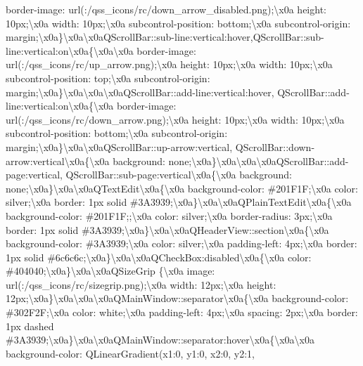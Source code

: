 border-\/image\+: url(\+:/qss\+\_\+icons/rc/down\+\_\+arrow\+\_\+disabled.\+png);\textbackslash{}x0a height\+: 10px;\textbackslash{}x0a width\+: 10px;\textbackslash{}x0a subcontrol-\/position\+: bottom;\textbackslash{}x0a subcontrol-\/origin\+: margin;\textbackslash{}x0a\}\textbackslash{}x0a\textbackslash{}x0a\+Q\+Scroll\+Bar\+::sub-\/line\+:vertical\+:hover,\+Q\+Scroll\+Bar\+::sub-\/line\+:vertical\+:on\textbackslash{}x0a\{\textbackslash{}x0a\textbackslash{}x0a border-\/image\+: url(\+:/qss\+\_\+icons/rc/up\+\_\+arrow.\+png);\textbackslash{}x0a height\+: 10px;\textbackslash{}x0a width\+: 10px;\textbackslash{}x0a subcontrol-\/position\+: top;\textbackslash{}x0a subcontrol-\/origin\+: margin;\textbackslash{}x0a\}\textbackslash{}x0a\textbackslash{}x0a\textbackslash{}x0a\+Q\+Scroll\+Bar\+::add-\/line\+:vertical\+:hover, Q\+Scroll\+Bar\+::add-\/line\+:vertical\+:on\textbackslash{}x0a\{\textbackslash{}x0a border-\/image\+: url(\+:/qss\+\_\+icons/rc/down\+\_\+arrow.\+png);\textbackslash{}x0a height\+: 10px;\textbackslash{}x0a width\+: 10px;\textbackslash{}x0a subcontrol-\/position\+: bottom;\textbackslash{}x0a subcontrol-\/origin\+: margin;\textbackslash{}x0a\}\textbackslash{}x0a\textbackslash{}x0a\+Q\+Scroll\+Bar\+::up-\/arrow\+:vertical, Q\+Scroll\+Bar\+::down-\/arrow\+:vertical\textbackslash{}x0a\{\textbackslash{}x0a background\+: none;\textbackslash{}x0a\}\textbackslash{}x0a\textbackslash{}x0a\textbackslash{}x0a\+Q\+Scroll\+Bar\+::add-\/page\+:vertical, Q\+Scroll\+Bar\+::sub-\/page\+:vertical\textbackslash{}x0a\{\textbackslash{}x0a background\+: none;\textbackslash{}x0a\}\textbackslash{}x0a\textbackslash{}x0a\+Q\+Text\+Edit\textbackslash{}x0a\{\textbackslash{}x0a background-\/color\+: \#201\+F1\+F;\textbackslash{}x0a color\+: silver;\textbackslash{}x0a border\+: 1px solid \#3\+A3939;\textbackslash{}x0a\}\textbackslash{}x0a\textbackslash{}x0a\+Q\+Plain\+Text\+Edit\textbackslash{}x0a\{\textbackslash{}x0a background-\/color\+: \#201\+F1\+F;;\textbackslash{}x0a color\+: silver;\textbackslash{}x0a border-\/radius\+: 3px;\textbackslash{}x0a border\+: 1px solid \#3\+A3939;\textbackslash{}x0a\}\textbackslash{}x0a\textbackslash{}x0a\+Q\+Header\+View\+::section\textbackslash{}x0a\{\textbackslash{}x0a background-\/color\+: \#3\+A3939;\textbackslash{}x0a color\+: silver;\textbackslash{}x0a padding-\/left\+: 4px;\textbackslash{}x0a border\+: 1px solid \#6c6c6c;\textbackslash{}x0a\}\textbackslash{}x0a\textbackslash{}x0a\+Q\+Check\+Box\+:disabled\textbackslash{}x0a\{\textbackslash{}x0a color\+: \#404040;\textbackslash{}x0a\}\textbackslash{}x0a\textbackslash{}x0a\+Q\+Size\+Grip \{\textbackslash{}x0a image\+: url(\+:/qss\+\_\+icons/rc/sizegrip.\+png);\textbackslash{}x0a width\+: 12px;\textbackslash{}x0a height\+: 12px;\textbackslash{}x0a\}\textbackslash{}x0a\textbackslash{}x0a\textbackslash{}x0a\+Q\+Main\+Window\+::separator\textbackslash{}x0a\{\textbackslash{}x0a background-\/color\+: \#302\+F2\+F;\textbackslash{}x0a color\+: white;\textbackslash{}x0a padding-\/left\+: 4px;\textbackslash{}x0a spacing\+: 2px;\textbackslash{}x0a border\+: 1px dashed \#3\+A3939;\textbackslash{}x0a\}\textbackslash{}x0a\textbackslash{}x0a\+Q\+Main\+Window\+::separator\+:hover\textbackslash{}x0a\{\textbackslash{}x0a\textbackslash{}x0a background-\/color\+: Q\+Linear\+Gradient(x1\+:0, y1\+:0, x2\+:0, y2\+:1, 
